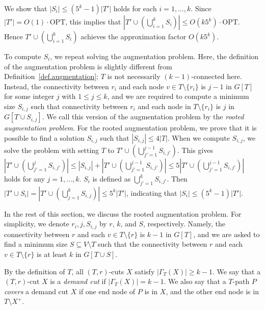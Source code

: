 \documentclass[11pt]{article}
\newcommand{\opt}{\mathrm{OPT}}
\begin{document}
We show that $|S_i| \leq (5^k-1)|T'|$ holds for each $i=1,\ldots,k$.
Since $|T'| =O(1) \cdot \opt$,
this implies that $|T' \cup (\bigcup_{i=1}^k S_i)| \leq O(k5^k) \cdot \opt$.
Hence $T' \cup (\bigcup_{i=1}^k S_i)$  achieves the approximation factor $O(k5^k)$.

To compute $S_i$, we repeat solving the augmentation problem.
Here, the definition of the augmentation problem is slightly different
from Definition~\ref{def.augmentation};
$T$ is not necessarily $(k-1)$-connected here.
Instead, the connectivity between $r_i$ and each node $v \in T\setminus
\{r_i\}$ is $j-1$ in $G[T]$ for some integer $j$
with $1 \leq j \leq k$,
and we are required to compute a minimum size $S_{i,j}$
such that
 connectivity between $r_i$ and each node in $T\setminus \{r_i\}$ is $j$ in $G[T
 \cup S_{i,j}]$.
We call this version of the augmentation problem by the \emph{rooted
augmentation problem}.
For the rooted augmentation problem,
 we prove that it is possible to find a solution $S_{i,j}$
 such that $|S_{i,j}|\leq 4 |T|$.
 When we compute $S_{i,j}$, we solve the problem
 with setting $T$ to $T' \cup (\bigcup_{j'=1}^{j-1}S_{i,j'})$.
 This gives $|T' \cup (\bigcup_{j'=1}^{j} S_{i,j'})|
 \leq |S_{i,j}| + |T' \cup (\bigcup_{j'=1}^{j-1} S_{i,j'})| \leq 5|T'
 \cup (\bigcup_{j'=1}^{j-1} S_{i,j'})|$
 holds for any $j=1,\ldots,k$.
 $S_i$ is defined as $\bigcup_{j'=1}^{k} S_{i,j'}$.
 Then $|T' \cup S_i|= |T'\cup (\bigcup_{j=1}^k S_{i,j})| \leq 5^k |T'|$,
 indicating that $|S_i| \leq (5^k -1)|T'|$.
 
 In the rest of this section, we discuss the rooted augmentation
 problem.
 For simplicity,
 we denote $r_i, j, S_{i,j}$ by $r$, $k$, and $S$, respectively.
 Namely, the connectivity between $r$ and each $v \in T \setminus \{r\}$ is $k-1$
 in $G[T]$, and we are asked to find a minimum size $S \subseteq V
 \setminus T$
 such that the connectivity between $r$ and each $v \in T \setminus \{r\}$ is at least $k$ in
 $G[T \cup S]$.


 By the definition of $T$,
all $(T,r)$-cuts $X$ satisfy $|\Gamma_T(X)|\geq k-1$.
We say that a $(T,r)$-cut $X$ is a \emph{demand cut}
if $|\Gamma_T(X)|=k-1$.
We also say that a $T$-path $P$ \emph{covers} a demand cut $X$
if one end node of $P$ is in $X$, and the other end node is in
$T\setminus X^+$.
\end{document}
